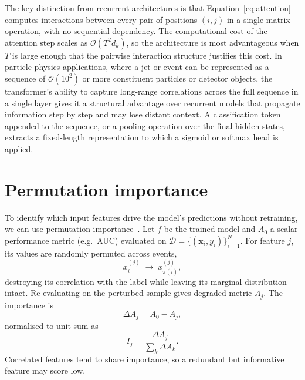 The key distinction from recurrent architectures is that Equation~\eqref{eq:attention} computes interactions between every pair of positions $(i,j)$ in a single matrix operation, with no sequential dependency.  The computational cost of the attention step scales as $\mathcal{O}(T^{2}d_{k})$, so the architecture is most advantageous when $T$ is large enough that the pairwise interaction structure justifies this cost.  In particle physics applications, where a jet or event can be represented as a sequence of $\mathcal{O}(10^2)$ or more constituent particles or detector objects, the transformer's ability to capture long-range correlations across the full sequence in a single layer gives it a structural advantage over recurrent models that propagate information step by step and may lose distant context.  A classification token appended to the sequence, or a pooling operation over the final hidden states, extracts a fixed-length representation to which a sigmoid or softmax head is applied.

\section{Permutation importance}
\label{sec:permutation_importance}
To identify which input features drive the model's predictions without retraining, we can use permutation importance~\cite{Breiman:2001RF}. Let $f$ be the trained model and $A_0$ a scalar performance metric (e.g.\ AUC) evaluated on $\mathcal{D}=\{(\mathbf{x}_i,y_i)\}_{i=1}^{N}$. For feature $j$, its values are randomly permuted across events,
\begin{equation}
  x^{(j)}_i \;\longrightarrow\; x^{(j)}_{\pi(i)},
\end{equation}
destroying its correlation with the label while leaving its marginal distribution intact. Re-evaluating on the perturbed sample gives degraded metric $A_j$. The importance is
\begin{equation}
  \Delta A_j = A_0 - A_j,
\end{equation}
normalised to unit sum as
\begin{equation}
  I_j = \frac{\Delta A_j}{\sum_{k}\Delta A_k}.
  \label{eq:rel_importance}
\end{equation}
Correlated features tend to share importance, so a redundant but informative feature may score low.